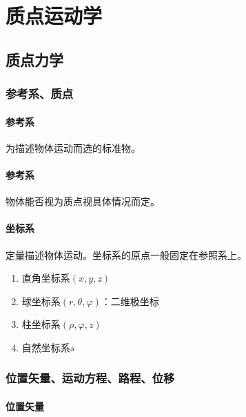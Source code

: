 \documentclass[
	12pt, %
	fleqn, %
	a4paper, %
]{myLegrandOrangeBook}
\begin{document}

\chapter{质点运动学}

\section{质点力学}

\subsection{参考系、质点}

\subsubsection*{参考系}

    为描述物体运动而选的标准物。

\subsubsection*{参考系}

    物体能否视为质点视具体情况而定。

\subsubsection*{坐标系}

    定量描述物体运动。坐标系的原点一般固定在参照系上。

    \begin{enumerate}
        \item 直角坐标系\(\left(x,y,z\right)\)
        \item 球坐标系\(\left(r,\theta,\varphi\right)\)：二维极坐标
        \item 柱坐标系\(\left(\rho,\varphi,z\right)\)
        \item 自然坐标系\(s\)
    \end{enumerate}

\subsection{位置矢量、运动方程、路程、位移}

\subsubsection*{位置矢量}
\end{document}
